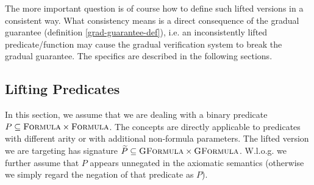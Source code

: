 The more important question is of course how to define such lifted versions in a consistent way.
What consistency means is a direct consequence of the gradual guarantee (definition \ref{grad-guarantee-def}), i.e. an inconsistently lifted predicate/function may cause the gradual verification system to break the gradual guarantee.
The specifics are described in the following sections.

\subsection{Lifting Predicates}
In this section, we assume that we are dealing with a binary predicate $P \subseteq \textsc{Formula} \times \textsc{Formula}$.
The concepts are directly applicable to predicates with different arity or with additional non-formula parameters.
The lifted version we are targeting has signature $\widetilde{P} \subseteq \textsc{GFormula} \times \textsc{GFormula}$.
W.l.o.g. we further assume that $P$ appears unnegated in the axiomatic semantics (otherwise we simply regard the negation of that predicate as $P$).

